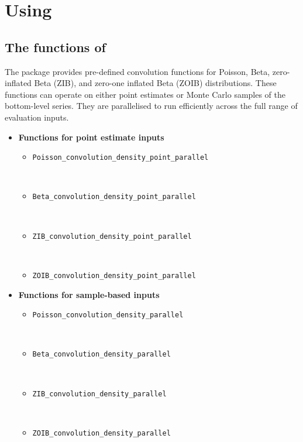\section{\texorpdfstring{Using }{Using }}\label{using}

\subsection{\texorpdfstring{The functions of }{The functions of }}\label{the-functions-of}

The package provides pre-defined convolution functions for Poisson, Beta, zero-inflated Beta (ZIB), and zero-one inflated Beta (ZOIB) distributions. These functions can operate on either point estimates or Monte Carlo samples of the bottom-level series. They are parallelised to run efficiently across the full range of evaluation inputs.

\begin{itemize}
\tightlist
\item
  \textbf{Functions for point estimate inputs}

  \begin{itemize}
  \tightlist
  \item
    \texttt{Poisson\_convolution\_density\_point\_parallel}\strut \\
  \item
    \texttt{Beta\_convolution\_density\_point\_parallel}\strut \\
  \item
    \texttt{ZIB\_convolution\_density\_point\_parallel}\strut \\
  \item
    \texttt{ZOIB\_convolution\_density\_point\_parallel}
  \end{itemize}
\item
  \textbf{Functions for sample-based inputs}

  \begin{itemize}
  \tightlist
  \item
    \texttt{Poisson\_convolution\_density\_parallel}\strut \\
  \item
    \texttt{Beta\_convolution\_density\_parallel}\strut \\
  \item
    \texttt{ZIB\_convolution\_density\_parallel}\strut \\
  \item
    \texttt{ZOIB\_convolution\_density\_parallel}
  \end{itemize}
\end{itemize}

